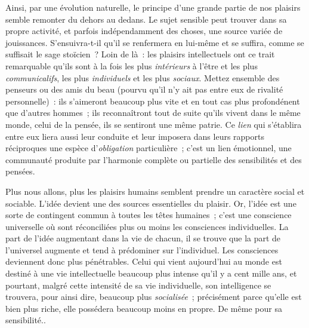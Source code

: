 \documentclass[french,twoside]{book} %
\begin{document}
Ainsi, par une évolution naturelle, le principe d’une grande partie de nos plaisirs semble remonter du dehors au dedans. Le sujet sensible peut trouver dans sa propre activité, et parfois indépendamment des choses, une source variée de jouissances. S’ensuivra-t-il qu’il se renfermera en lui-même et se suffira, comme se suffisait le sage stoïcien ? Loin de là : les plaisirs intellectuels ont ce trait remarquable qu’ils sont à la fois les plus \emph{intérieurs} à l’être et les plus \emph{communicalifs}, les plus \emph{individuels} et les plus \emph{sociaux}. Mettez ensemble des penseurs ou des amis du beau (pourvu qu’il n’y ait pas entre eux de rivalité personnelle) : ils s’aimeront beaucoup plus vite et en tout cas plus profondénent que d’autres hommes ; ils reconnaîtront tout de suite qu’ils vivent dans le même monde, celui de la pensée, ils se sentiront une même patrie. Ce \emph{lien} qui s’établira entre eux liera aussi leur conduite et leur imposera dans leurs rapports réciproques une espèce d’\emph{obligation} particulière ; c’est un lien émotionnel, une communauté produite par l’harmonie complète ou partielle des sensibilités et des pensées.\par
Plus nous allons, plus les plaisirs humains semblent prendre un caractère social et sociable. L’idée devient une des sources essentielles du plaisir. Or, l’idée est une sorte de contingent commun à toutes les têtes humaines ; c’est une conscience universelle où sont réconciliées plus ou moins les consciences individuelles. La part de l’idée augmentant dans la vie de chacun, il se trouve que la part de l’universel augmente et tend à prédominer sur l’individuel. Les consciences deviennent donc plus pénétrables. Celui qui vient aujourd’hui au monde est destiné à une vie intellectuelle beaucoup plus intense qu’il y a cent mille ans, et pourtant, malgré cette intensité de sa vie individuelle, son intelligence se trouvera, pour ainsi dire, beaucoup plus \emph{socialisée} ; précisément parce qu’elle est bien plus riche, elle possédera beaucoup moins en propre. De même pour sa sensibilité..\par
\end{document}

